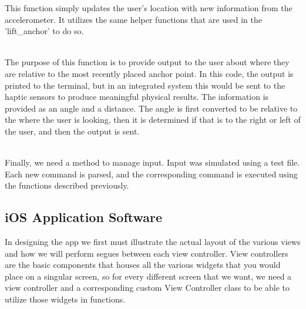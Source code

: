 \documentclass[letterpaper,12pt]{article}
\begin{document}
This function simply updates the user's location with new information from the accelerometer. It utilizes the same helper functions that are used in the 'lift\_anchor' to do so. \newline \par

 \\

The purpose of this function is to provide output to the user about where they are relative to the most recently placed anchor point. In this code, the output is printed to the terminal, but in an integrated system this would be sent to the haptic sensors to produce meaningful physical results. The information is provided as an angle and a distance. The angle is first converted to be relative to the where the user is looking, then it is determined if that is to the right or left of the user, and then the output is sent. \newline \par

 \\

Finally, we need a method to manage input. Input was simulated using a test file. Each new command is parsed, and the corresponding command is executed using the functions described previously. \newline \par

\subsection{iOS Application Software}

    In designing the app we first must illustrate the actual layout of the various views and how we will perform segues between each view controller. View controllers are the basic components that houses all the various widgets that you would place on a singular screen, so for every different screen that we want, we need a view controller and a corresponding custom View Controller class to be able to utilize those widgets in functions. 
    
\end{document}
